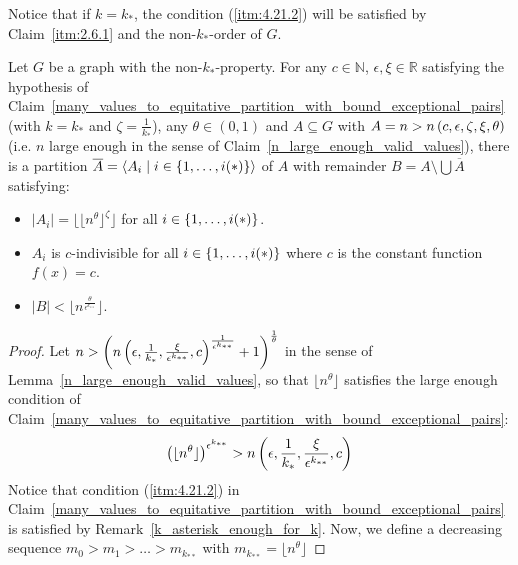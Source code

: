     \begin{lemma}[Remark 4.22] \label{k_asterisk_enough_for_k}
        Notice that if $k = k_*$, the condition (\ref{itm:4.21.2}) will be satisfied by Claim~\ref{itm:2.6.1}
        and the non-$k_*$-order of $G$.
    \end{lemma}

    \begin{theorem}[Theorem 4.23]
        Let $G$ be a graph with the non-$k_*$-property.
        For any $c \in \mathbb{N}$, $\epsilon, \xi \in \mathbb{R}$ satisfying the hypothesis of Claim~\ref{many_values_to_equitative_partition_with_bound_exceptional_pairs}
        (with $k = k_*$ and $\zeta = \frac{1}{k_*}$), any $\theta \in (0,1)$ and $A \subseteq G$ with
        $A = n > n\left( c, \epsilon, \zeta, \xi, \theta \right)$ (i.e. $n$ large enough in the sense of Claim~\ref{n_large_enough_valid_values}),
        there is a partition $\overline{A} = \left< A_i \mid i \in \left\{ 1, \dots, i(*) \right\} \right>$ of $A$ with remainder $B = A \setminus \bigcup \overline{A}$
        satisfying:
        \begin{itemize}
            \item $|A_i| = \lfloor \lfloor n^\theta \rfloor ^\zeta \rfloor$ for all $i \in \left\{ 1, \dots, i(*) \right\}$.
            \item $A_i$ is $c$-indivisible for all $i \in \left\{ 1, \dots, i(*) \right\}$ where $c$ is the constant function $f(x) = c$.
            \item $|B| < \lfloor n^{\frac{\theta}{\epsilon^{k_{**}}}} \rfloor$.
        \end{itemize}
        \begin{proof}
            Let $n > \left( n\left(  \epsilon, \frac{1}{k_*}, \frac{\xi}{\epsilon^{k_{**}}}, c \right)^{\frac{1}{\epsilon^{k_{**}}}} + 1  \right)^{\frac{1}{\theta}}$
            in the sense of Lemma~\ref{n_large_enough_valid_values}, so that $\lfloor n^\theta \rfloor$ satisfies the
            large enough condition of Claim~\ref{many_values_to_equitative_partition_with_bound_exceptional_pairs}:
            \[
                \left( \lfloor n^\theta \rfloor \right)^{\epsilon^{k_{**}}}
                    > n\left( \epsilon, \frac{1}{k_*}, \frac{\xi}{\epsilon^{k_{**}}}, c \right)
            \]
            Notice that condition (\ref{itm:4.21.2}) in Claim~\ref{many_values_to_equitative_partition_with_bound_exceptional_pairs}
            is satisfied by Remark~\ref{k_asterisk_enough_for_k}.
            Now, we define a decreasing sequence $m_0 > m_1 > \dots > m_{k_{**}}$ with $m_{k_{**}} = \lfloor n^\theta \rfloor$

\end{proof}
\end{theorem}
